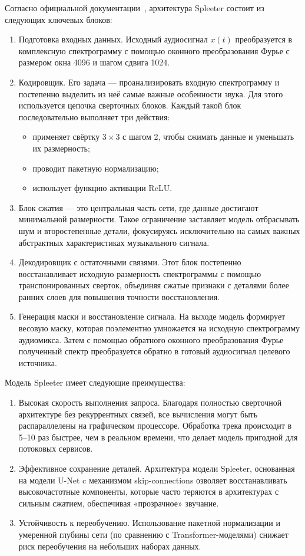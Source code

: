 \documentclass[14pt]{extarticle}
\begin{document}
Согласно официальной документации~\cite{SpleeterArch}, архитектура Spleeter состоит 
из следующих ключевых блоков:
\begin{enumerate}[label=\arabic*)]
	\item Подготовка входных данных. Исходный аудиосигнал $x(t)$ преобразуется в комплексную спектрограмму с помощью оконного 
	преобразования Фурье с размером окна 4096 и шагом сдвига 1024.
	\item Кодировщик. Его задача --- проанализировать входную спектрограмму и постепенно выделить из неё самые важные особенности звука. Для этого используется цепочка сверточных блоков. Каждый такой блок последовательно выполняет три действия:
	\begin{itemize}[label=$\bullet$, wide]
		\item применяет свёртку $3 \times 3$ с шагом 2, чтобы сжимать данные и уменьшать их размерность;
		\item проводит пакетную нормализацию;
		\item использует функцию активации ReLU.
	\end{itemize}
	\item Блок сжатия --- это центральная часть сети, где данные достигают минимальной размерности.
	Такое ограничение заставляет модель отбрасывать шум и второстепенные детали, фокусируясь исключительно на самых важных абстрактных 
    характеристиках музыкального сигнала.
	\item Декодировщик с остаточными связями. Этот блок постепенно восстанавливает 
	исходную размерность спектрограммы с помощью транспонированных сверток, объединяя сжатые признаки с деталями более ранних слоев
	для повышения точности восстановления.
	\item Генерация маски и восстановление сигнала. На выходе модель формирует весовую маску, которая поэлементно умножается на 
	исходную спектрограмму аудиомикса. Затем с помощью обратного оконного преобразования Фурье полученный 
    спектр преобразуется обратно в готовый аудиосигнал целевого источника.
\end{enumerate}

Модель Spleeter имеет следующие преимущества:
\begin{enumerate}[label=\arabic*)]
	\item Высокая скорость выполнения запроса. Благодаря полностью сверточной архитектуре без рекуррентных связей, 
	все вычисления могут быть распараллелены на графическом процессоре. Обработка трека происходит в 5–10 раз быстрее, чем в реальном 
	времени, что делает модель пригодной для потоковых сервисов.
	\item Эффективное сохранение деталей. Архитектура модели Spleeter, основанная на модели U-Net c 
	механизмом skip-connections озволяет восстанавливать высокочастотные компоненты, которые часто теряются в 
	архитектурах с сильным сжатием, обеспечивая «прозрачное» звучание.
	\item Устойчивость к переобучению. Использование пакетной нормализации и умеренной глубины сети 
	(по сравнению с Transformer-моделями) снижает риск переобучения на небольших наборах данных.
\end{enumerate}
\end{document}
